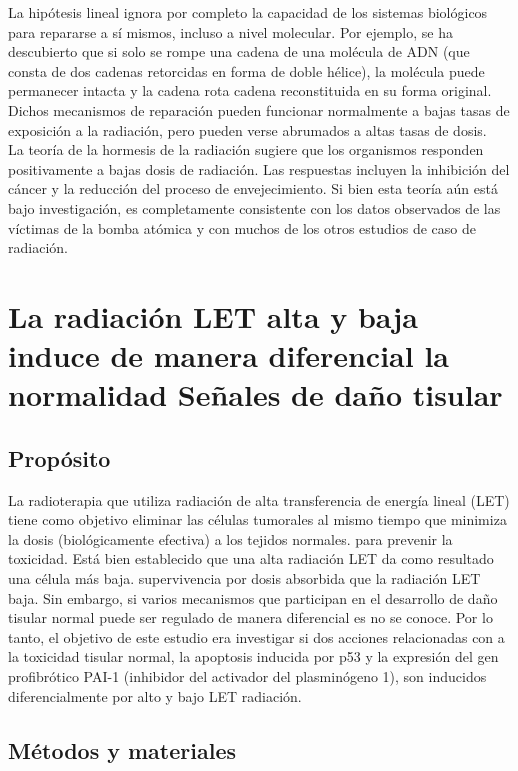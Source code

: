 \documentclass[]{article}
\begin{document}
La hipótesis lineal ignora por completo la capacidad de los sistemas biológicos para repararse a sí mismos, incluso a nivel molecular. Por ejemplo, se ha descubierto que si solo se rompe una cadena de una molécula de ADN (que consta de dos cadenas retorcidas en forma de doble hélice), la molécula puede permanecer intacta y la cadena rota cadena reconstituida en su forma original. Dichos mecanismos de reparación pueden funcionar normalmente a bajas tasas de exposición a la radiación, pero pueden verse abrumados a altas tasas de dosis.\\

La teoría de la hormesis de la radiación sugiere que los organismos responden positivamente a bajas dosis de radiación. Las respuestas incluyen la inhibición del cáncer y la reducción del proceso de envejecimiento. Si bien esta teoría aún está bajo investigación, es completamente consistente con los datos observados de las víctimas de la bomba atómica y con muchos de los otros estudios de caso de radiación.\citep{Lamarsh2001}\\

\section{La radiación LET alta y baja induce de manera diferencial la normalidad
	Señales de daño tisular}

\subsection{Propósito}

 La radioterapia que utiliza radiación de alta transferencia de energía lineal (LET) tiene como objetivo eliminar las células tumorales al mismo tiempo que minimiza la dosis (biológicamente efectiva) a los tejidos normales.
para prevenir la toxicidad. Está bien establecido que una alta radiación LET da como resultado una célula más baja.
supervivencia por dosis absorbida que la radiación LET baja. Sin embargo, si varios mecanismos
que participan en el desarrollo de daño tisular normal puede ser regulado de manera diferencial es
no se conoce. Por lo tanto, el objetivo de este estudio era investigar si dos acciones relacionadas con
a la toxicidad tisular normal, la apoptosis inducida por p53 y la expresión del gen profibrótico
PAI-1 (inhibidor del activador del plasminógeno 1), son inducidos diferencialmente por alto y bajo LET
radiación.

\subsection{Métodos y materiales}
\end{document}
